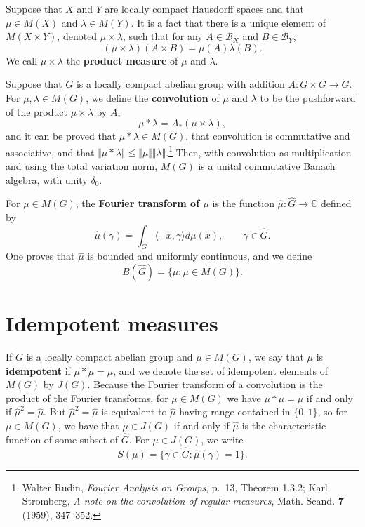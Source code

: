 \documentclass{article}
\newcommand{\inner}[2]{\langle #1, #2 \rangle}
\newcommand{\norm}[1]{\Vert #1 \Vert}
\begin{document}
Suppose that $X$ and $Y$ are locally compact Hausdorff spaces and that $\mu \in M(X)$ and $\lambda \in M(Y)$. It is a fact that there
is a unique element of $M(X \times Y)$, denoted $\mu \times \lambda$, such that for any $A \in \mathscr{B}_X$ and $B \in \mathscr{B}_Y$,
\[
(\mu \times \lambda)(A \times B) = \mu(A) \lambda(B).
\]
We call $\mu \times \lambda$ the \textbf{product measure} of $\mu$ and $\lambda$. 

Suppose that $G$ is a locally compact abelian group with addition $A:G \times G \to G$. For $\mu,\lambda \in M(G)$,
we define the \textbf{convolution} of $\mu$ and $\lambda$ to be the pushforward of the product $\mu \times \lambda$ by
$A$,
\[
\mu * \lambda = A_*(\mu \times \lambda),
\]
and it can be proved that $\mu * \lambda \in M(G)$, that convolution is commutative and associative, and that
$\norm{\mu * \lambda} \leq \norm{\mu} \norm{\lambda}$.\footnote{Walter Rudin, {\em Fourier Analysis on Groups}, p.~13,
Theorem 1.3.2; Karl Stromberg, {\em A note on the convolution of regular measures}, Math. Scand. \textbf{7} (1959), 347--352.} Then, with convolution as multiplication and using the total variation norm,
$M(G)$ is a unital commutative Banach algebra, with unity $\delta_0$.

For $\mu \in M(G)$, the \textbf{Fourier transform of $\mu$}
is the function $\hat{\mu}:\widehat{G} \to \mathbb{C}$ defined by
\[
\hat{\mu}(\gamma) = \int_G \inner{-x}{\gamma} d\mu(x), \qquad \gamma \in \widehat{G}.
\]
One proves that $\hat{\mu}$ is bounded and uniformly continuous, and we define 
\[
B(\widehat{G}) = \{\hat{\mu}: \mu \in M(G)\}.
\]


\section{Idempotent measures}
If $G$ is a locally compact abelian group and $\mu \in M(G)$, we say that $\mu$ is \textbf{idempotent} if $\mu * \mu=\mu$,
and we denote the set of idempotent elements of $M(G)$ by $J(G)$. 
Because the Fourier transform of a convolution is the product of the Fourier transforms, 
for $\mu \in M(G)$ we have $\mu*\mu=\mu$ if and only if $\hat{\mu}^2 = \hat{\mu}$. But $\hat{\mu}^2 = \hat{\mu}$ is equivalent to $\hat{\mu}$
having range contained in $\{0,1\}$, so for $\mu \in M(G)$, we have that
$\mu \in J(G)$ if and only if $\hat{\mu}$ is the characteristic function of some subset of $\widehat{G}$. 
For $\mu \in J(G)$, we write
\[
S(\mu) = \{\gamma \in \widehat{G}: \hat{\mu}(\gamma)=1\}.
\]
\end{document}
